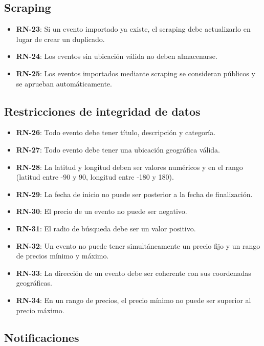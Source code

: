 \subsection{Scraping}

\begin{itemize}
    \item \textbf{RN-23}: Si un evento importado ya existe, el scraping debe actualizarlo en lugar de crear un duplicado.
    \item \textbf{RN-24}: Los eventos sin ubicación válida no deben almacenarse.
    \item \textbf{RN-25}: Los eventos importados mediante scraping se consideran públicos y se aprueban automáticamente.

\end{itemize}

\subsection{Restricciones de integridad de datos}

\begin{itemize}
    \item \textbf{RN-26}: Todo evento debe tener título, descripción y categoría.
    \item \textbf{RN-27}: Todo evento debe tener una ubicación geográfica válida.
    \item \textbf{RN-28}: La latitud y longitud deben ser valores numéricos y en el rango (latitud entre -90 y 90, longitud entre -180 y 180).
    \item \textbf{RN-29}: La fecha de inicio no puede ser posterior a la fecha de finalización.
    \item \textbf{RN-30}: El precio de un evento no puede ser negativo.
    \item \textbf{RN-31}: El radio de búsqueda debe ser un valor positivo.
    \item \textbf{RN-32}: Un evento no puede tener simultáneamente un precio fijo y un rango de precios mínimo y máximo.
    \item \textbf{RN-33}: La dirección de un evento debe ser coherente con sus coordenadas geográficas.
    \item \textbf{RN-34}: En un rango de precios, el precio mínimo no puede ser superior al precio máximo.


\end{itemize}

\subsection{Notificaciones}

